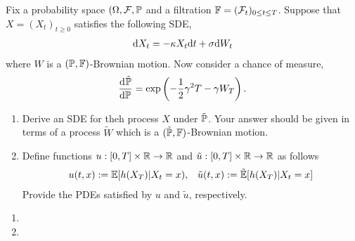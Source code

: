 \begin{problem}
    Fix a probability space \( (\Omega, \mathcal{F}, \mathbb{P}\) and a filtration \( \mathbb{F} = (\mathcal{F}_t )_{0\leq t \leq T} \). Suppose that \( X = (X_t)_{t\geq 0} \) satisfies the following SDE,
    \begin{align*}
        \mathrm{d} X_t = - \kappa X_t\mathrm{d} t + \sigma \mathrm{d} W_t
    \end{align*}
    where \( W \) is a \( (\mathbb{P},\mathbb{F}) \)-Brownian motion. Now consider a chance of measure,
    \begin{align*}
        \frac{\mathrm{d}^{}\tilde{\mathbb{P}}}{\mathrm{d} \mathbb{P}^{}} = \exp \left( -\frac{1}{2}\gamma^2 T - \gamma W_T \right).
    \end{align*}
\begin{enumerate}[nolistsep,label=(\alph*)]
    \item Derive an SDE for theh process \( X \) under \( \tilde{\mathbb{P}} \). Your answer should be given in terms of a process \( \tilde{W} \) which is a \( (\tilde{\mathbb{P}},\mathbb{F}) \)-Brownian motion.
    \item Define functions \( u:[0,T]\times \mathbb{R} \to \mathbb{R} \) and \( \tilde{u}:[0,T]\times \mathbb{R} \to \mathbb{R} \) as follows
        \begin{align*}
            u(t,x):= \mathbb{E}[h(X_T) | X_t = x), && \tilde{u}(t,x):= \tilde{\mathbb{E}}[h(X_T) | X_t = x]
        \end{align*}
        Provide the PDEs satisfied by \( u \) and \( \tilde{u} \), respectively.
\end{enumerate}


\end{problem}

\begin{solution}[Solution]
\begin{enumerate}[label=(\alph*)]
    \item 
    \item 
\end{enumerate}
\end{solution}


